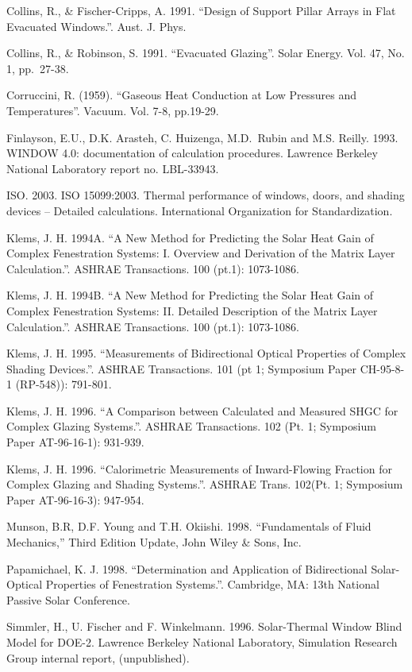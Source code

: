 Collins, R., \& Fischer-Cripps, A. 1991. ``Design of Support Pillar Arrays in Flat Evacuated Windows.''. Aust. J. Phys.

Collins, R., \& Robinson, S. 1991. ``Evacuated Glazing''. Solar Energy. Vol. 47, No. 1, pp.~27-38.

Corruccini, R. (1959). ``Gaseous Heat Conduction at Low Pressures and Temperatures''. Vacuum. Vol. 7-8, pp.19-29.

Finlayson, E.U., D.K. Arasteh, C. Huizenga, M.D.~Rubin and M.S. Reilly. 1993. WINDOW 4.0: documentation of calculation procedures. Lawrence Berkeley National Laboratory report no. LBL-33943.

ISO. 2003. ISO 15099:2003. Thermal performance of windows, doors, and shading devices -- Detailed calculations. International Organization for Standardization.

Klems, J. H. 1994A. ``A New Method for Predicting the Solar Heat Gain of Complex Fenestration Systems: I. Overview and Derivation of the Matrix Layer Calculation.''. ASHRAE Transactions. 100 (pt.1): 1073-1086.

Klems, J. H. 1994B. ``A New Method for Predicting the Solar Heat Gain of Complex Fenestration Systems: II. Detailed Description of the Matrix Layer Calculation.''. ASHRAE Transactions. 100 (pt.1): 1073-1086.

Klems, J. H. 1995. ``Measurements of Bidirectional Optical Properties of Complex Shading Devices.''. ASHRAE Transactions. 101 (pt 1; Symposium Paper CH-95-8-1 (RP-548)): 791-801.

Klems, J. H. 1996. ``A Comparison between Calculated and Measured SHGC for Complex Glazing Systems.''. ASHRAE Transactions. 102 (Pt. 1; Symposium Paper AT-96-16-1): 931-939.

Klems, J. H. 1996. ``Calorimetric Measurements of Inward-Flowing Fraction for Complex Glazing and Shading Systems.''. ASHRAE Trans. 102(Pt. 1; Symposium Paper AT-96-16-3): 947-954.

Munson, B.R, D.F. Young and T.H. Okiishi. 1998. ``Fundamentals of Fluid Mechanics,'' Third Edition Update, John Wiley \& Sons, Inc.

Papamichael, K. J. 1998. ``Determination and Application of Bidirectional Solar-Optical Properties of Fenestration Systems.''. Cambridge, MA: 13th National Passive Solar Conference.

Simmler, H., U. Fischer and F. Winkelmann. 1996. Solar-Thermal Window Blind Model for DOE-2. Lawrence Berkeley National Laboratory, Simulation Research Group internal report, (unpublished).

